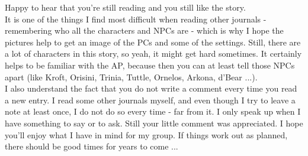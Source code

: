 Happy to hear that you're still reading and you still like the story.\\

It is one of the things I find most difficult when reading other journals - remembering who all the characters and NPCs are - which is why I hope the pictures help to get an image of the PCs and some of the settings. Still, there are a lot of characters in this story, so yeah, it might get hard sometimes. It certainly helps to be familiar with the AP, because then you can at least tell those NPCs apart (like Kroft, Orisini, Trinia, Tuttle, Ornelos, Arkona, d'Bear ...).\\

I also understand the fact that you do not write a comment every time you read a new entry. I read some other journals myself, and even though I try to leave a note at least once, I do not do so every time - far from it. I only speak up when I have something to say or to ask. Still your little comment was appreciated. I hope you'll enjoy what I have in mind for my group. If things work out as planned, there should be good times for years to come ...\\

